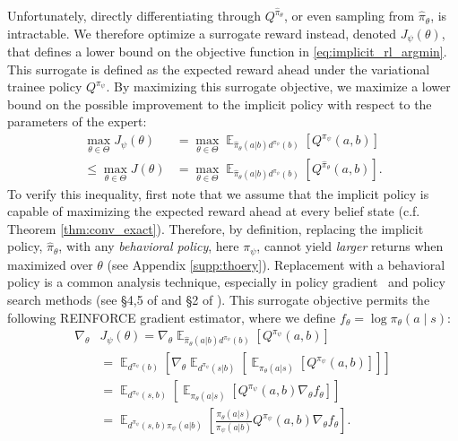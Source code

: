 Unfortunately, directly differentiating through $Q^{\hat{\pi}_\theta}$, or even sampling from $\hat{\pi}_\theta$, is intractable.  We therefore optimize a surrogate reward instead, denoted $J_{\psi}(\theta)$, that defines a lower bound on the objective function in \eqref{eq:implicit_rl_argmin}.  This surrogate is defined as the expected reward ahead under the variational trainee policy $Q^{{\pi_{\psi}}}$.  By maximizing this surrogate objective, we maximize a lower bound on the possible improvement to the implicit policy with respect to the parameters of the expert:
\begin{align}
    \max_{\theta \in \Theta} J_{\psi}(\theta) &= \max_{\theta \in \Theta} \mathop{\mathbb{E}}_{{\hat{\pi}_\theta(a|b) d^{{\pi_{\psi}}}(b)}} \left[ Q^{{\pi_{\psi}}}(a,b) \right] \label{equ:bound:1}\\
    \leq \max_{\theta \in \Theta} J(\theta) &= \max_{\theta \in \Theta}  \mathop{\mathbb{E}}_{{\hat{\pi}_\theta(a|b) d^{{\pi_{\psi}}}(b)}} \left[ Q^{{\hat{\pi}_{\theta}}}(a,b) \right] . \label{equ:bound:2}
\end{align}
To verify this inequality, first note that we assume that the implicit policy is capable of maximizing the expected reward ahead at every belief state (c.f. Theorem \ref{thm:conv_exact}).  Therefore, by definition, replacing the implicit policy, $\hat{\pi}_{\theta}$, with any \emph{behavioral policy}, here $\pi_{\psi}$, cannot yield \emph{larger} returns when maximized over $\theta$ (see Appendix \ref{supp:thoery}).  Replacement with a behavioral policy is a common analysis technique, especially in policy gradient~\citep{schulman2015trust,schulman2017proximal,sutton1992reinforcement} and policy search methods (see \S 4,5 of \citet{bertsekas2019reinforcement} and \S 2 of \citet{deisenroth2013survey}).  This surrogate objective permits the following REINFORCE gradient estimator, where we define $f_{\theta} = \log \pi_{\theta}(a \mid s)$:
\begin{align}
    \nabla_{\theta} & J_{\psi}(\theta) =  \nabla_{\theta} \mathop{\mathbb{E}}\nolimits_{{\hat{\pi}_\theta(a|b) d^{{\pi_{\psi}}}(b)}} \left[ Q^{{\pi_{\psi}}}(a,b) \right] \\
    &= \mathop{\mathbb{E}}\nolimits_{{d^{\pi_{\psi}}(b)}} \left[ \nabla_{\theta} \mathop{\mathbb{E}}\nolimits_{{ d^{{\pi_{\psi}}}(s | b)}} \left[ 
        \mathop{\mathbb{E}}\nolimits_{{\pi_\theta(a|s)}} \left[ Q^{{\pi_{\psi}}}(a,b) \right] \right] \right] \nonumber \\
    &= \mathop{\mathbb{E}}\nolimits_{{d^{{\pi_{\psi}}}(s, b)}} \left[ \mathop{\mathbb{E}}\nolimits_{\pi_{\theta}(a|s)} \left[ 
        Q^{{\pi_{\psi}}}(a,b) \nabla_\theta f_\theta \right] \right] \nonumber \\
    &= \mathop{\mathbb{E}}\nolimits_{d^{\pi_{\psi}}(s, b) \pi_{\psi}(a | b)} \left[ \frac{\pi_{\theta}(a|s)}{\pi_{\psi}(a | b)} Q^{{\pi_{\psi}}}(a,b) \nabla_\theta f_{\theta} \right]. \label{equ:expert-gradient}
\end{align}
